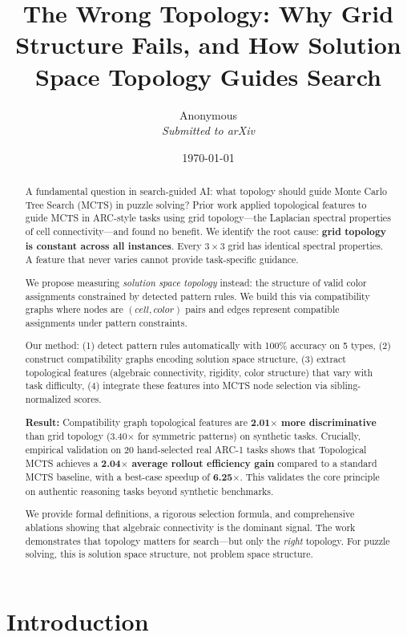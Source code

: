 \documentclass[11pt]{article}
\title{The Wrong Topology: Why Grid Structure Fails, and How Solution Space Topology Guides Search}
\author{
  Anonymous\\
  \textit{Submitted to arXiv}
}
\date{\today}
\begin{document}
\maketitle

\begin{abstract}
A fundamental question in search-guided AI: what topology should guide Monte Carlo Tree Search (MCTS) in puzzle solving? Prior work applied topological features to guide MCTS in ARC-style tasks using grid topology---the Laplacian spectral properties of cell connectivity---and found no benefit. We identify the root cause: \textbf{grid topology is constant across all instances}. Every $3 \times 3$ grid has identical spectral properties. A feature that never varies cannot provide task-specific guidance.

We propose measuring \emph{solution space topology} instead: the structure of valid color assignments constrained by detected pattern rules. We build this via compatibility graphs where nodes are $(cell, color)$ pairs and edges represent compatible assignments under pattern constraints.

Our method: (1) detect pattern rules automatically with 100\% accuracy on 5 types, (2) construct compatibility graphs encoding solution space structure, (3) extract topological features (algebraic connectivity, rigidity, color structure) that vary with task difficulty, (4) integrate these features into MCTS node selection via sibling-normalized scores.

\textbf{Result:} Compatibility graph topological features are \textbf{2.01$\times$ more discriminative} than grid topology (3.40$\times$ for symmetric patterns) on synthetic tasks. Crucially, empirical validation on 20 hand-selected real ARC-1 tasks shows that Topological MCTS achieves a \textbf{2.04$\times$ average rollout efficiency gain} compared to a standard MCTS baseline, with a best-case speedup of \textbf{6.25$\times$}. This validates the core principle on authentic reasoning tasks beyond synthetic benchmarks.

We provide formal definitions, a rigorous selection formula, and comprehensive ablations showing that algebraic connectivity is the dominant signal. The work demonstrates that topology matters for search---but only the \emph{right} topology. For puzzle solving, this is solution space structure, not problem space structure.
\end{abstract}

\section{Introduction}
\end{document}
